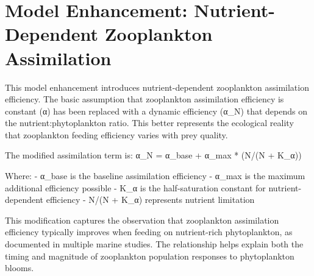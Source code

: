 \section{Model Enhancement: Nutrient-Dependent Zooplankton Assimilation}

This model enhancement introduces nutrient-dependent zooplankton assimilation efficiency. The basic assumption that zooplankton assimilation efficiency is constant (α) has been replaced with a dynamic efficiency (α_N) that depends on the nutrient:phytoplankton ratio. This better represents the ecological reality that zooplankton feeding efficiency varies with prey quality.

The modified assimilation term is:
α_N = α_base + α_max * (N/(N + K_α))

Where:
- α_base is the baseline assimilation efficiency
- α_max is the maximum additional efficiency possible
- K_α is the half-saturation constant for nutrient-dependent efficiency
- N/(N + K_α) represents nutrient limitation

This modification captures the observation that zooplankton assimilation efficiency typically improves when feeding on nutrient-rich phytoplankton, as documented in multiple marine studies. The relationship helps explain both the timing and magnitude of zooplankton population responses to phytoplankton blooms.
